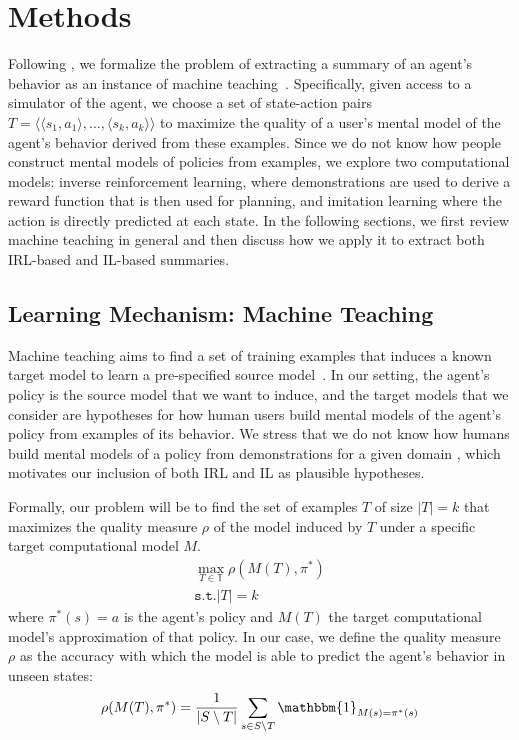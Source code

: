\documentclass{article}
\begin{document}
\section{Methods}
Following \cite{huang17communicate}, we formalize the problem of extracting a summary of an agent's behavior as an instance of machine teaching~\cite{zhu2015machine}. Specifically, given access to a simulator of the agent, we choose a set of state-action pairs $T = \langle \langle s_{1},a_{1} \rangle,...,\langle s_{k},a_{k} \rangle \rangle$ to maximize the quality of a user's mental model of the agent's behavior derived from these examples. Since we do not know how people construct mental models of policies from examples, we explore two computational models: inverse reinforcement learning, where demonstrations are used to derive a reward function that is then used for planning, and imitation learning where the action is directly predicted at each state. In the following sections, we first review machine teaching in general and then discuss how we apply it to extract both IRL-based and IL-based summaries.

\subsection{Learning Mechanism: Machine Teaching}
Machine teaching aims to find a set of training examples that induces a known target model to learn a pre-specified source model~\cite{zhu2015machine}. In our setting, the agent's policy is the source model that we want to induce, and the target models that we consider are hypotheses for how human users build mental models of the agent's policy from examples of its behavior. We stress that we do not know how humans build mental models of a policy from demonstrations for a given domain \cite{gershman2017reinforcement}, which motivates our inclusion of both IRL and IL as plausible hypotheses. 

Formally, our problem will be to find the set of examples $T$ of size $|T| = k$ that maximizes the quality measure $\rho$ of the model induced by $T$ under a specific target computational model $M$. 
\begin{eqnarray*}
 \max_{T \in \mathbb{T}} \rho(M(T), \pi^*)\\
 \texttt{s.t.} |T| = k
\end{eqnarray*}
where $\pi^{*}(s) = a$ is the agent's policy and $M(T)$ the target computational model's approximation of that policy. In our case, we define the quality measure $\rho$ as the accuracy with which the model is able to predict the agent's behavior in unseen states:
\begin{equation}
 \rho(M(T), \pi^*) = \frac{1}{|S\setminus T|} \sum_{s \in S\setminus T} \mathbbm{1}_{M(s)=\pi^{*}(s)}
\end{equation} 
\end{document}
